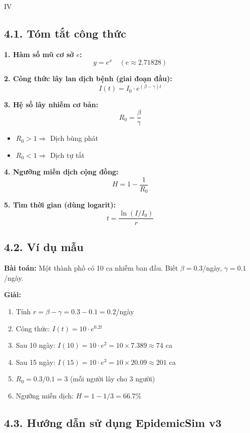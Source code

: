 \documentclass[12pt,a4paper]{article}
\begin{document}
\begin{competitionsection}{IV}
\vspace{0.5cm}

\subsection*{4.1. Tóm tắt công thức}

\begin{mathbox}
\textbf{1. Hàm số mũ cơ sở $e$:}
$$y = e^x \quad (e \approx 2.71828)$$

\textbf{2. Công thức lây lan dịch bệnh (giai đoạn đầu):}
$$\boxed{I(t) = I_0 \cdot e^{(\beta - \gamma)t}}$$

\textbf{3. Hệ số lây nhiễm cơ bản:}
$$R_0 = \frac{\beta}{\gamma}$$
\begin{itemize}
\item $R_0 > 1 \Rightarrow$ Dịch bùng phát
\item $R_0 < 1 \Rightarrow$ Dịch tự tắt
\end{itemize}

\textbf{4. Ngưỡng miễn dịch cộng đồng:}
$$H = 1 - \frac{1}{R_0}$$

\textbf{5. Tìm thời gian (dùng logarit):}
$$t = \frac{\ln(I/I_0)}{r}$$
\end{mathbox}

\subsection*{4.2. Ví dụ mẫu}

\textbf{Bài toán:} Một thành phố có 10 ca nhiễm ban đầu. Biết $\beta = 0.3$/ngày, $\gamma = 0.1$/ngày.

\textbf{Giải:}
\begin{enumerate}
\item Tính $r = \beta - \gamma = 0.3 - 0.1 = 0.2$/ngày
\item Công thức: $I(t) = 10 \cdot e^{0.2t}$
\item Sau 10 ngày: $I(10) = 10 \cdot e^{2} = 10 \times 7.389 \approx 74$ ca
\item Sau 15 ngày: $I(15) = 10 \cdot e^{3} = 10 \times 20.09 \approx 201$ ca
\item $R_0 = 0.3/0.1 = 3$ (mỗi người lây cho 3 người)
\item Ngưỡng miễn dịch: $H = 1 - 1/3 = 66.7\%$
\end{enumerate}

\subsection*{4.3. Hướng dẫn sử dụng EpidemicSim v3}


\end{competitionsection}
\end{document}
